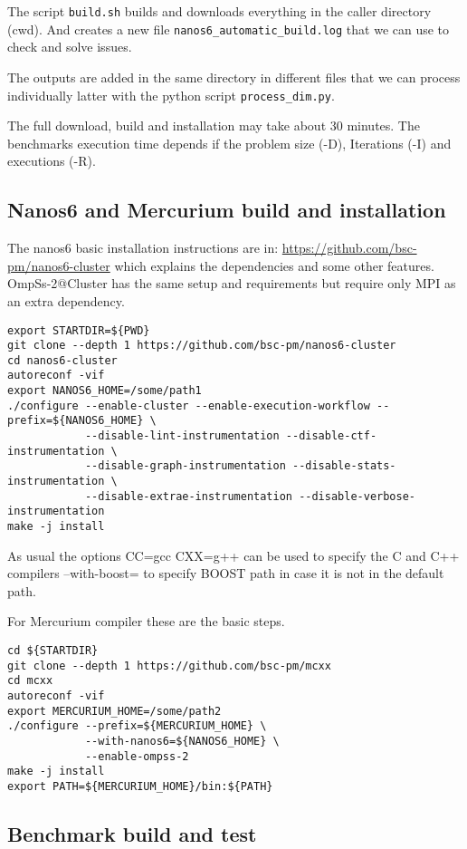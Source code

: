 \documentclass{article}
\newcommand{\code}[1]{\texttt{#1}}
\begin{document}
The script \code{build.sh} builds and downloads everything in the
caller directory (cwd). And creates a new file
\code{nanos6\_automatic\_build.log} that we can use to check and solve
issues.

The outputs are added in the same directory in different files that we
can process individually latter with the python script
\code{process\_dim.py}.

The full download, build and installation may take about 30
minutes. The benchmarks execution time depends if the problem size
(-D), Iterations (-I) and executions (-R).

\subsection{Nanos6 and Mercurium build and installation}

The nanos6 basic installation instructions are in:
\url{https://github.com/bsc-pm/nanos6-cluster} which explains the
dependencies and some other features.  OmpSs-2@Cluster has the same
setup and requirements but require only MPI as an extra dependency.

\begin{lstlisting}
export STARTDIR=${PWD}
git clone --depth 1 https://github.com/bsc-pm/nanos6-cluster
cd nanos6-cluster
autoreconf -vif
export NANOS6_HOME=/some/path1
./configure --enable-cluster --enable-execution-workflow --prefix=${NANOS6_HOME} \
            --disable-lint-instrumentation --disable-ctf-instrumentation \
            --disable-graph-instrumentation --disable-stats-instrumentation \
            --disable-extrae-instrumentation --disable-verbose-instrumentation
make -j install
\end{lstlisting}

As usual the options CC=gcc CXX=g++ can be used to specify the C and
C++ compilers --with-boost= to specify BOOST path in case it is not in
the default path.

For Mercurium compiler these are the basic steps.

\begin{lstlisting}
cd ${STARTDIR}
git clone --depth 1 https://github.com/bsc-pm/mcxx
cd mcxx
autoreconf -vif
export MERCURIUM_HOME=/some/path2
./configure --prefix=${MERCURIUM_HOME} \
            --with-nanos6=${NANOS6_HOME} \
            --enable-ompss-2
make -j install
export PATH=${MERCURIUM_HOME}/bin:${PATH}
\end{lstlisting}

\subsection{Benchmark build and test}
\end{document}
